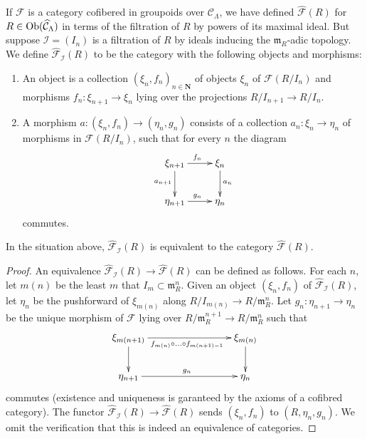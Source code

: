 \noindent
If $\mathcal{F}$ is a category cofibered in groupoids over $\mathcal
C_\Lambda$, we have defined $\widehat{\mathcal{F}}(R)$ for $R \in
\mathop{\rm Ob}\nolimits(\widehat{\mathcal{C}}_\Lambda)$ in terms of the filtration of
$R$ by powers of its maximal ideal.  But suppose $\mathcal{I} = (I_n)$ is a
filtration of $R$ by ideals inducing the $\mathfrak{m}_R$-adic topology.  We
define $\widehat{\mathcal{F}}_\mathcal{I}(R)$ to be the category with the
following objects and morphisms:
\begin{enumerate}
\item An object is a collection $(\xi_n, f_n)_{n \in \mathbf{N}}$ of
objects $\xi_n$ of $\mathcal{F}(R/I_n)$ and morphisms
$f_n : \xi_{n + 1} \to \xi_n$ lying over the projections
$R/I_{n + 1} \to R/I_n$.
\item A morphism $a: (\xi_n, f_n) \to (\eta_n, g_n)$ consists of a
collection $a_n : \xi_n \to \eta_n$ of morphisms in
$\mathcal{F}(R/I_n)$, such that for every $n$ the diagram
$$
\xymatrix{
\xi_{n + 1} \ar[r]^{f_n} \ar[d]_{a_{n + 1}} & \xi_n \ar[d]^{a_n} \\
\eta_{n + 1} \ar[r]^{g_n} & \eta_n
}
$$
commutes.
\end{enumerate}

\begin{lemma}
\label{lemma-formal-objects-different-filtration}
In the situation above, $\widehat{\mathcal{F}}_\mathcal{I}(R)$ is equivalent
to the category $\widehat{\mathcal{F}}(R)$.
\end{lemma}

\begin{proof}
An equivalence
$\widehat{\mathcal{F}}_\mathcal{I}(R) \to \widehat{\mathcal{F}}(R)$
can be defined as follows.  For each $n$, let $m(n)$ be the least $m$
that $I_m \subset \mathfrak m_R^n$.  Given an object
$(\xi_n, f_n)$ of $\widehat{\mathcal{F}}_\mathcal{I}(R)$, let
$\eta_n$ be the pushforward of $\xi_{m(n)}$ along
$R/I_{m(n)} \to R/\mathfrak m_R^n$. Let $g_n : \eta_{n + 1} \to \eta_n$
be the unique morphism of $\mathcal{F}$ lying over
$R/\mathfrak m_R^{n + 1} \to R/\mathfrak m_R^n$ such that
$$
\xymatrix{
\xi_{m(n + 1)} \ar[rrr]_{f_{m(n)} \circ \ldots \circ f_{m(n + 1) - 1}} \ar[d]
& & & \xi_{m(n)} \ar[d] \\
\eta_{n + 1} \ar[rrr]^{g_n} & & & \eta_n
}
$$
commutes (existence and uniqueness is garanteed by the axioms of a
cofibred category). The functor
$\widehat{\mathcal{F}}_\mathcal{I}(R) \to \widehat{\mathcal{F}}(R)$
sends $(\xi_n, f_n)$ to $(R, \eta_n, g_n)$. We omit the
verification that this is indeed an equivalence of categories.
\end{proof}

